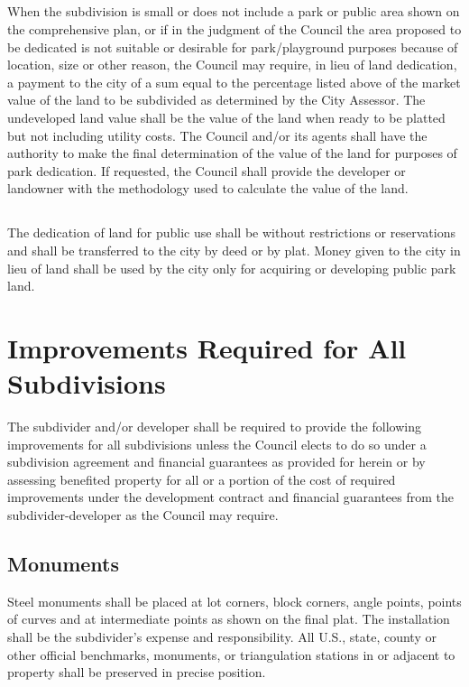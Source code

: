 \subsection{}
When the subdivision is small or does not include a park or public area shown on the comprehensive plan, or if in the judgment of the Council the area proposed to be dedicated is not suitable or desirable for park/playground purposes because of location, size or other reason, the Council may require, in lieu of land dedication, a payment to the city of a sum equal to the percentage listed above of the market value of the land to be subdivided as determined by the City Assessor. The undeveloped land value shall be the value of the land when ready to be platted but not including utility costs. The Council and/or its agents shall have the authority to make the final determination of the value of the land for purposes of park dedication. If requested, the Council shall provide the developer or landowner with the methodology used to calculate the value of the land.
\subsection{}
The dedication of land for public use shall be without restrictions or reservations and shall be transferred to the city by deed or by plat. Money given to the city in lieu of land shall be used by the city only for acquiring or developing public park land.



\setcounter{section}{49}
\section{Improvements Required for All Subdivisions}
The subdivider and/or developer shall be required to provide the following improvements for all subdivisions unless the Council elects to do so under a subdivision agreement and financial guarantees as provided for herein or by assessing benefited property for all or a portion of the cost of required improvements under the development contract and financial guarantees from the subdivider-developer as the Council may require.
\subsection{Monuments}
Steel monuments shall be placed at lot corners, block corners, angle points, points of curves and at intermediate points as shown on the final plat. The installation shall be the subdivider’s expense and responsibility. All U.S., state, county or other official benchmarks, monuments, or triangulation stations in or adjacent to property shall be preserved in precise position.

